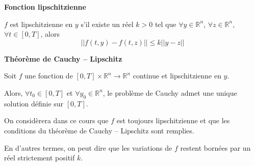 \documentclass[10pt,fleqn]{article} %
\begin{document}
\begin{defi}
\textbf{Fonction lipschitzienne}

$f$ est lipschitzienne en $y$ s'il existe un réel $k>0$ tel que $\forall y\in\mathbb{R}^n$, $\forall z\in\mathbb{R}^n$, $\forall t\in[0,T]$, alors 
$$
||f(t,y)-f(t,z)||\leq k||y-z||
$$

\end{defi}

\begin{theorem}
\textbf{Théorème de Cauchy -- Lipschitz}

Soit $f$ une fonction de $[0,T] \times \mathbb{R}^n \rightarrow \mathbb{R}^n$ continue et lipschitzienne en $y$. 

Alors, $\forall t_0 \in [0,T]$ et $\forall y_0 \in \mathbb{R}^n$, le problème de Cauchy admet une unique solution définie sur $[0,T]$.

\end{theorem}

On considèrera dans ce cours que $f$ est toujours lipschitzienne et que les conditions du théorème de Cauchy -- Lipschitz sont remplies. 

En d'autres termes, on peut dire que les variations de $f$ restent bornées par un réel strictement positif $k$.
\end{document}
